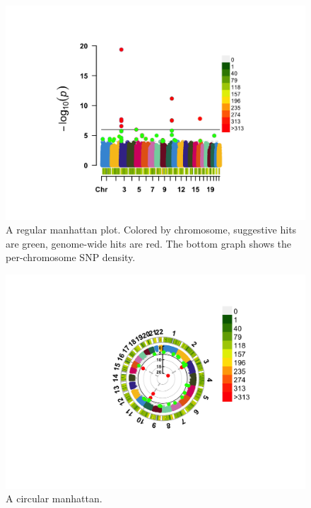 \documentclass[
]{book}
\begin{document}
\begin{figure}

{\centering \includegraphics[width=18.67in]{img/_gwas/show-cmplot-all-manhattan} 

}

\caption{A regular manhattan plot. Colored by chromosome, suggestive hits are green, genome-wide hits are red. The bottom graph shows the per-chromosome SNP density.}\label{fig:show-cmplot-all-manhattan}
\end{figure}

\begin{figure}

{\centering \includegraphics[width=18.67in]{img/_gwas/show-cmplot-all-circular} 

}

\caption{A circular manhattan.}\label{fig:show-cmplot-all-circular}
\end{figure}
\end{document}
